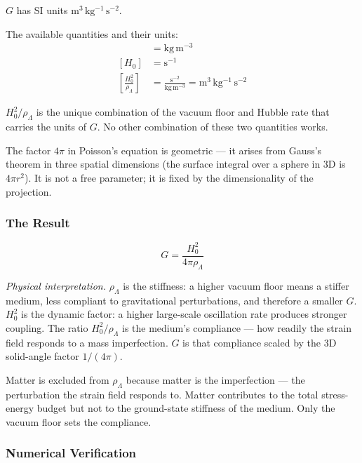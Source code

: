 \documentclass[11pt,letterpaper]{article}
\begin{document}
\(G\) has SI units \(\mathrm{m^3\,kg^{-1}\,s^{-2}}\).

The available quantities and their units:
\begin{align*}
[\rho_\Lambda] &= \mathrm{kg\,m^{-3}}\\
[H_0] &= \mathrm{s^{-1}}\\
\left[\frac{H_0^2}{\rho_\Lambda}\right] &= \frac{\mathrm{s^{-2}}}{\mathrm{kg\,m^{-3}}} = \mathrm{m^3\,kg^{-1}\,s^{-2}}
\end{align*}

\(H_0^2/\rho_\Lambda\) is the unique combination of the vacuum floor and Hubble rate that carries the units of \(G\). No other combination of these two quantities works.

The factor \(4\pi\) in Poisson's equation is geometric --- it arises from Gauss's theorem in three spatial dimensions (the surface integral over a sphere in 3D is \(4\pi r^2\)). It is not a free parameter; it is fixed by the dimensionality of the projection.

\subsubsection{The Result}
\label{sec:orgc5d4b0b}

\begin{equation}
\boxed{G = \frac{H_0^2}{4\pi\rho_\Lambda}}
\end{equation}

\emph{Physical interpretation.} \(\rho_\Lambda\) is the stiffness: a higher vacuum floor means a stiffer medium, less compliant to gravitational perturbations, and therefore a smaller \(G\). \(H_0^2\) is the dynamic factor: a higher large-scale oscillation rate produces stronger coupling. The ratio \(H_0^2/\rho_\Lambda\) is the medium's compliance --- how readily the strain field responds to a mass imperfection. \(G\) is that compliance scaled by the 3D solid-angle factor \(1/(4\pi)\).

Matter is excluded from \(\rho_\Lambda\) because matter is the imperfection --- the perturbation the strain field responds to. Matter contributes to the total stress-energy budget but not to the ground-state stiffness of the medium. Only the vacuum floor sets the compliance.

\subsubsection{Numerical Verification}
\label{sec:org2781987}
\end{document}
